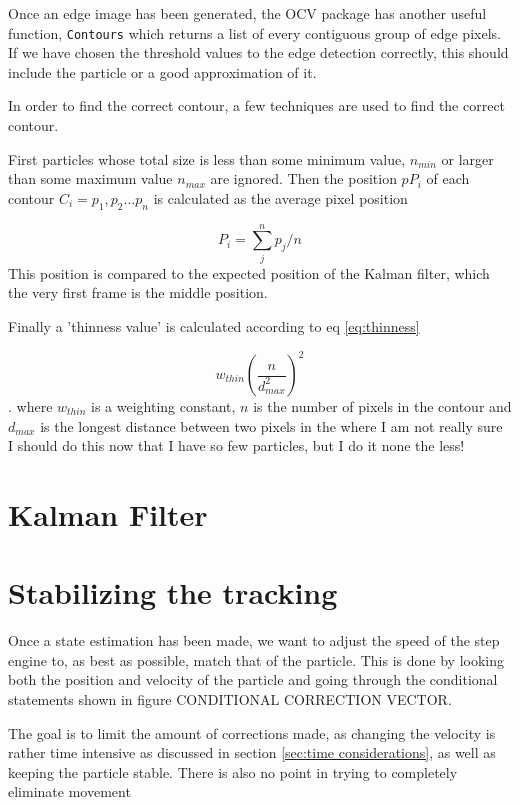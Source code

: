 \documentclass[]{report}
\begin{document}
Once an edge image has been generated, the OCV package has another useful function, \texttt{Contours} which returns a list of every contiguous group of edge pixels. If we have chosen the threshold values to the edge detection correctly, this should include the particle or a good approximation of it. 

In order to find the correct contour, a few techniques are used to find the correct contour.

First particles whose total size is less than some minimum value, $ n_{min}$ or larger than some maximum value $n_{max}$ are ignored. Then the position $pP_i$ of each contour $C_i={p_1,p_2...p_n}$ is calculated as the average pixel position

\[
P_i = \sum_{j}^n p_j/n
\]
This position is compared to the expected position of the Kalman filter, which the very first frame is the middle position. 

Finally a 'thinness value' is calculated according to eq \ref{eq:thinness}

\begin{equation}\label{eq:thinness}
w_{thin}\left(\frac{ n}{d_{max}^2}\right)^2
\end{equation}. 
where $w_{thin}$ is a weighting constant, $n$ is the number of pixels in the contour and $d_{max}$ is the longest distance between two pixels in the 
where I am not really sure I should do this now that I have so few particles, but I do it none the less!



\section{Kalman Filter}


\section{Stabilizing the tracking}
Once a state estimation has been made, we want to adjust the speed of the step engine to, as best as possible, match that of the particle. This is done by looking both the position and velocity of the particle and going through the conditional statements shown in figure CONDITIONAL CORRECTION VECTOR. 

The goal is to limit the amount of corrections made, as changing the velocity is rather time intensive as discussed in section \ref{sec:time considerations}, as well as keeping the particle stable. There is also no point in trying to completely eliminate movement
\end{document}
